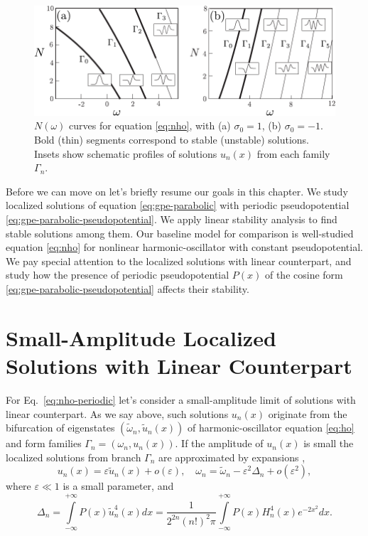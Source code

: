 \begin{figure}[h]
\centering
	\includegraphics[scale = 1]{pic/stability for nho with constant pseudopotential}
	\caption{
		$N(\omega)$ curves for equation \eqref{eq:nho}, with (a) $\sigma_0 = 1$, (b) $\sigma_0 = -1$.
		Bold (thin) segments correspond to stable (unstable) solutions.
		Insets show schematic profiles of solutions $u_n(x)$ from each family $\Gamma_n$.
	}
\label{fig:branches-nho}
\end{figure}

Before we can move on let's briefly resume our goals in this chapter.
We study localized solutions of equation \eqref{eq:gpe-parabolic} with periodic pseudopotential \eqref{eq:gpe-parabolic-pseudopotential}.
We apply linear stability analysis to find stable solutions among them.
Our baseline model for comparison is well-studied equation \eqref{eq:nho} for nonlinear harmonic-oscillator with constant pseudopotential.
We pay special attention to the localized solutions with linear counterpart, and study how the presence of periodic pseudopotential $P(x)$ of the cosine form \eqref{eq:gpe-parabolic-pseudopotential} affects their stability.

\section{Small-Amplitude Localized Solutions with Linear Counterpart}

For Eq.~\eqref{eq:nho-periodic} let's consider a small-amplitude limit of solutions with linear counterpart.
As we say above, such solutions $u_n(x)$ originate from the bifurcation of eigenstates $(\tilde{\omega}_n, \tilde{u}_n(x))$ of harmonic-oscillator equation \eqref{eq:ho} and form families $\Gamma_n = (\omega_n, u_n(x))$.
If the amplitude of $u_n(x)$ is small the localized solutions from branch $\Gamma_n$ are approximated by expansions \cite{ZezyulinAlfimovKonotopPerecGarcia2008},
\begin{equation}
	u_n(x) = \varepsilon \tilde{u}_n(x) + o(\varepsilon), \quad \omega_n = \tilde{\omega}_n - \varepsilon^2 \Delta_n + o(\varepsilon^2),
\label{eq:small-amplitude-expansion}
\end{equation}
where $\varepsilon \ll 1$ is a small parameter, and
\begin{equation}
	\Delta_n = \int \limits_{-\infty}^{+\infty} P(x) \tilde{u}_n^4(x) dx = \dfrac{1}{2^{2n} (n!)^2 \pi} \int \limits_{-\infty}^{+\infty} P(x) H_n^4(x) e^{-2x^2} dx.
\label{eq:Delta_n}
\end{equation}

